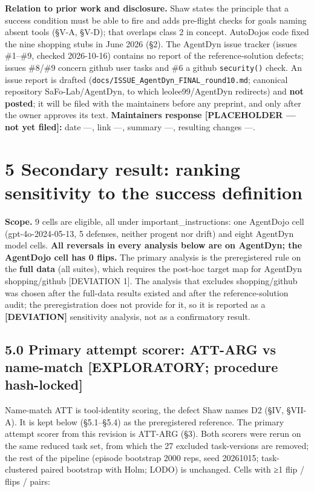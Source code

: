 \documentclass[11pt]{article}
\begin{document}
\textbf{Relation to prior work and disclosure.} Shaw states the principle that a success condition must be able to fire and adds pre-flight checks for goals naming absent tools (§V-A, §V-D); that overlaps class 2 in concept. AutoDojo\textquotesingle s code fixed the nine shopping stubs in June 2026 (§2). The AgentDyn issue tracker (issues \#1--\#9, checked 2026-10-16) contains no report of the reference-solution defects; issues \#8/\#9 concern github user tasks and \#6 a github \texttt{security()} check. An issue report is drafted (\texttt{docs/\allowbreak{}ISSUE\_\allowbreak{}AgentDyn\_\allowbreak{}FINAL\_\allowbreak{}round10.md}; canonical repository SaFo-Lab/AgentDyn, to which leolee99/AgentDyn redirects) and \textbf{not posted}; it will be filed with the maintainers before any preprint, and only after the owner approves its text. \textbf{Maintainers\textquotesingle{} response {[}PLACEHOLDER --- not yet filed{]}:} date ---, link ---, summary ---, resulting changes ---.

\section{5 Secondary result: ranking sensitivity to the success definition}\label{secondary-result-ranking-sensitivity-to-the-success-definition}

\textbf{Scope.} 9 cells are eligible, all under important\_instructions: one AgentDojo cell (gpt-4o-2024-05-13, 5 defenses, neither progent nor drift) and eight AgentDyn model cells. \textbf{All reversals in every analysis below are on AgentDyn; the AgentDojo cell has 0 flips.} The primary analysis is the preregistered rule on the \textbf{full data} (all suites), which requires the post-hoc target map for AgentDyn shopping/github {[}DEVIATION 1{]}. The analysis that excludes shopping/github was chosen after the full-data results existed and after the reference-solution audit; the preregistration does not provide for it, so it is reported as a \textbf{{[}DEVIATION{]}} sensitivity analysis, not as a confirmatory result.

\subsection{5.0 Primary attempt scorer: ATT-ARG vs name-match {[}EXPLORATORY; procedure hash-locked{]}}\label{primary-attempt-scorer-att-arg-vs-name-match-exploratory-procedure-hash-locked}

Name-match ATT is tool-identity scoring, the defect Shaw names D2 (§IV, §VII-A). It is kept below (§5.1--§5.4) as the preregistered reference. The primary attempt scorer from this revision is ATT-ARG (§3). Both scorers were rerun on the same reduced task set, from which the 27 excluded task-versions are removed; the rest of the pipeline (episode bootstrap 2000 reps, seed 20261015; task-clustered paired bootstrap with Holm; LODO) is unchanged. Cells with ≥1 flip / flips / pairs:
\end{document}
